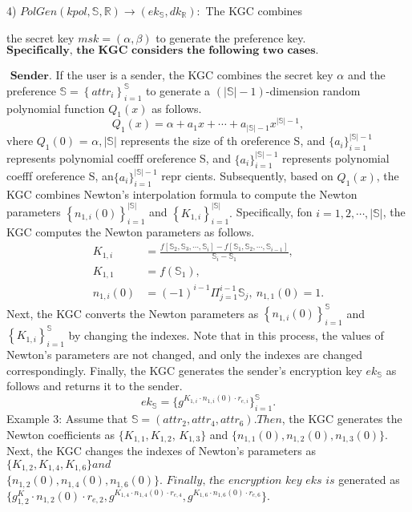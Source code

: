 \documentclass[runningheads]{llncs}
\begin{document}
4) $PolGen( kpol, \mathbb{S} , \mathbb{R} ) \to ( ek_\mathbb{S} , dk_\mathbb{R} ) {: }$ The KGC combines

the secret key $msk=(\alpha,\beta)$ to generate the preference key.
$\textbf{Specifically, the KGC considers the following two cases. }$

$\textbf{ Sender.}$ If the user is a sender, the KGC combines the secret key $\alpha$ and the preference $\mathbb{S}=\left\{attr_i\right\}_{i=1}^{\mathbb{S}}$ to generate a $(|\mathbb{S}|-1)$-dimension random polynomial function $Q_1(x)$ as follows.
$$Q_1(x)=\alpha+a_1x+\cdots+a_{|\mathbb{S}|-1}x^{|\mathbb{S}|-1},$$
vhere $Q_1( 0)$ = $\alpha , | \mathbb{S} |$ represents the size of th oreference S, and $\{ a_i\} _{i= 1}^{| \mathbb{S} | - 1}$ represents polynomial coefff oreference S, and $\{ a_i\} _{i= 1}^{| \mathbb{S} | - 1}$ represents polynomial coefff oreference S, an$\{ a_i\} _{i= 1}^{| \mathbb{S} | - 1}$ repr cients. Subsequently, based on $Q_1(x)$, the KGC combines Newton's interpolation formula to compute the Newton parameters $\left\{n_{1,i}(0)\right\}_{i=1}^{|\mathbb{S}|}$ and $\left\{K_{1,i}\right\}_{i=1}^{|\mathbb{S}|}.$ Specifically, fon $i=1,2,\cdots,|\mathbb{S}|$, the KGC computes the Newton parameters as follows.
$$\begin{aligned}K_{1,i}&=\frac{f[\mathbb{S}_2,\mathbb{S}_3,\cdots,\mathbb{S}_i]-f[\mathbb{S}_1,\mathbb{S}_2,\cdots,\mathbb{S}_{i-1}]}{\mathbb{S}_i-\mathbb{S}_1},\\K_{1,1}&=f(\mathbb{S}_1),\\n_{1,i}(0)&=(-1)^{i-1}\Pi_{j=1}^{i-1}\mathbb{S}_j,\:n_{1,1}(0)=1.\end{aligned}$$
Next, the KGC converts the Newton parameters as $\left\{n_{1,i}(0)\right\}_{i=1}^{\mathbb{S}}$ and $\left\{K_{1,i}\right\}_{i=1}^{\mathbb{S}}$ by changing the indexes. Note that in this process, the values of Newton's parameters are not changed, and only the indexes are changed correspondingly. Finally, the KGC generates the sender's encryption key $ek_{\mathbb{S}}$ as follows and returns it to the sender.
$$ek_\mathbb{S}=\{g^{K_{1,i}\cdot n_{1,i}(0)\cdot r_{e,i}}\}_{i=1}^\mathbb{S}.$$
Example 3: Assume that $\mathbb{S}=(attr_{2},attr_{4},attr_{6}).Then$, the KGC generates the Newton coefficients as $\{K_{1,1},K_{1,2}$, $K_{1,3}\}$ and $\{n_{1,1}(0),n_{1,2}(0),n_{1,3}(0)\}.$ Next, the KGC changes the indexes of Newton's parameters as $\{ K_{1, 2}, K_{1, 4}, K_{1, 6}\} \textit{and}$ $\{ n_{1, 2}( 0) , n_{1, 4}( 0) , n_{1, 6}( 0) \} . \textit{ Finally, the encryption key eks is}$ generated as $\{g^K_{1,2}\cdot n_{1,2}(0)\cdot r_{e,2},g^{K_{1,4}\cdot n_{1,4}(0)\cdot r_{e,4}},g^{K_{1,6}\cdot n_{1,6}(0)\cdot r_{e,6}}\}.$
\end{document}
